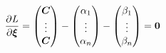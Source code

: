 \begin{eqnarray}
  \frac{\partial \it{L}}{\partial \bm{\xi}}
  =
  \begin{pmatrix}
    \bm{C}\\
    \vdots\\
    \bm{C}
  \end{pmatrix}
  -
  \begin{pmatrix}
    \alpha_1\\
    \vdots\\
    \alpha_n
  \end{pmatrix}
  -
  \begin{pmatrix}
    \beta_1\\
    \vdots\\
    \beta_n
  \end{pmatrix}
  =
  \bm{0}
\end{eqnarray}

  
